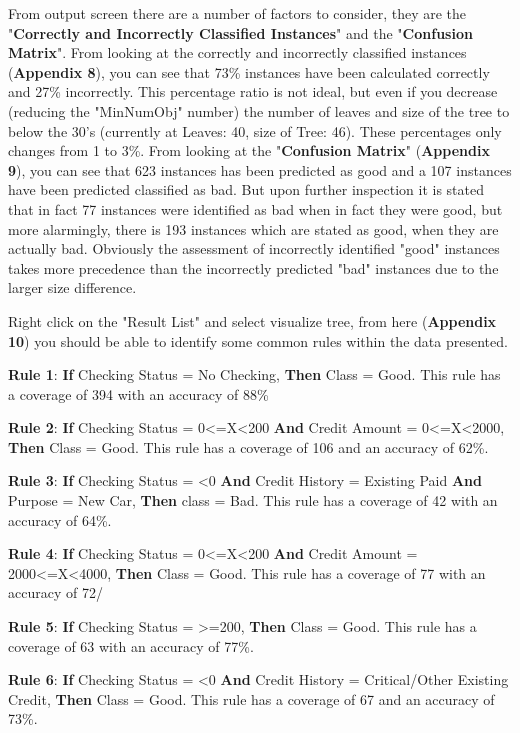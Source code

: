 \documentclass[12pt, a4paper]{article}
\begin{document}
    From output screen there are a number of factors to consider, they are the "\textbf{Correctly and Incorrectly Classified Instances}" and the "\textbf{Confusion Matrix}". From looking at the correctly and incorrectly classified instances (\textbf{Appendix 8}), you can see that 73\% instances have been calculated correctly and 27\% incorrectly. This percentage ratio is not ideal, but even if you decrease (reducing the "MinNumObj" number) the number of leaves and size of the tree to below the 30's (currently at Leaves: 40, size of Tree: 46). These percentages only changes from 1 to 3\%.  From looking at the "\textbf{Confusion Matrix}" (\textbf{Appendix 9}), you can see that 623 instances has been predicted as good and a 107 instances have been predicted classified as bad. But upon further inspection it is stated that in fact 77 instances were identified as bad when in fact they were good, but more alarmingly, there is 193 instances which are stated as good, when they are actually bad. Obviously the assessment of incorrectly identified "good" instances takes more precedence than the incorrectly predicted "bad" instances due to the larger size difference.
    
    Right click on the "Result List" and select visualize tree, from here (\textbf{Appendix 10}) you should be able to identify some common rules within the data presented.
    
    \textbf{Rule 1}: \textbf{If} Checking Status = No Checking, \textbf{Then} Class = Good. This rule has a coverage of 394 with an accuracy of 88\%
    
    \textbf{Rule 2}: \textbf{If} Checking Status = 0<=X<200 \textbf{And} Credit Amount = 0<=X<2000, \textbf{Then} Class = Good. This rule has a coverage of 106 and an accuracy of 62\%.
    
    \textbf{Rule 3}: \textbf{If} Checking Status = <0 \textbf{And} Credit History = Existing Paid \textbf{And} Purpose = New Car, \textbf{Then} class = Bad. This rule has a coverage of 42 with an accuracy of 64\%.
    
    \textbf{Rule 4}: \textbf{If} Checking Status = 0<=X<200 \textbf{And} Credit Amount = 2000<=X<4000, \textbf{Then} Class = Good. This rule has a coverage of 77 with an accuracy of 72/%
    
    \textbf{Rule 5}: \textbf{If} Checking Status = >=200, \textbf{Then} Class = Good. This rule has a coverage of 63 with an accuracy of 77\%.
    
    \textbf{Rule 6}: \textbf{If} Checking Status = <0 \textbf{And} Credit History = Critical/Other Existing Credit, \textbf{Then} Class = Good. This rule has a coverage of 67 and an accuracy of 73\%.
    
\end{document}
